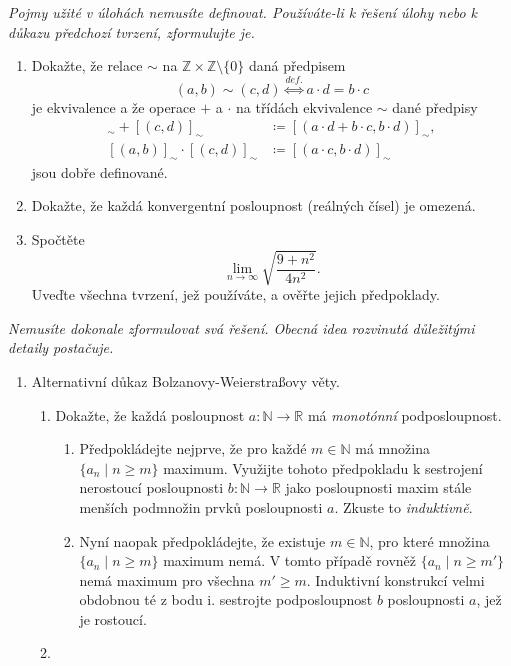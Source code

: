 \documentclass[a4paper,11pt]{article}
\newcommand{\R}{\mathbb{R}}
\newcommand{\N}{\mathbb{N}}
\newcommand{\Z}{\mathbb{Z}}
\begin{document}
 \begin{tcolorbox}[title=\textsf{Lehké úlohy a důkazy (6
  bodů)},arc=0mm,boxsep=3mm,bottomrule=1pt,toprule=3pt,leftrule=-0.1mm,
  rightrule=-0.1mm,colframe=Emerald!80!white,colback=Emerald!5!white]
  \emph{Pojmy užité v úlohách nemusíte definovat. Používáte-li k řešení úlohy
  nebo k důkazu předchozí tvrzení, zformulujte je.}
  \begin{enumerate}
   \item Dokažte, že relace $ \sim $ na $\Z \times \Z \setminus \{0\}$ daná
    předpisem
    \[
     (a,b) \sim (c,d) \overset{def.}{\Longleftrightarrow} a \cdot d = b \cdot c
    \]
    je ekvivalence a že operace $+$ a $ \cdot $ na třídách ekvivalence $ \sim $
    dané předpisy
    \begin{align*}
     [(a,b)]_{ \sim } + [(c,d)]_{ \sim } &\coloneqq [(a \cdot d + b \cdot c, b
     \cdot d)]_{ \sim },\\
     [(a,b)]_{ \sim } \cdot [(c,d)]_{ \sim } & \coloneqq [(a \cdot c,b \cdot
     d)]_{ \sim }
    \end{align*}
    jsou dobře definované.
   \item Dokažte, že každá konvergentní posloupnost (reálných čísel) je
    omezená.
   \item Spočtěte
    \[
     \lim_{n \to \infty} \sqrt{\frac{9 + n^2}{4n^2}}.
    \]
    Uveďte všechna tvrzení, jež používáte, a ověřte jejich předpoklady.
  \end{enumerate}
 \end{tcolorbox}
 \clearpage
 \begin{tcolorbox}[breakable,title=\textsf{Těžké úlohy a důkazy (12
  bodů)},arc=0mm,boxsep=3mm,bottomrule=1pt,toprule=1pt,leftrule=-0.1mm,
  rightrule=-0.1mm,colframe=BrickRed!80!white,colback=BrickRed!5!white]
  \emph{Nemusíte dokonale zformulovat svá řešení. Obecná idea rozvinutá
  důležitými detaily postačuje.}
  \begin{enumerate}
   \item Alternativní důkaz Bolzanovy-Weierstraßovy věty.
   \begin{enumerate}
    \item Dokažte, že každá posloupnost $a:\N \to \R$ má \emph{monotónní}
     podposloupnost.
    \begin{enumerate}
     \item Předpokládejte nejprve, že pro každé $m \in \N$ má množina $\{a_n
      \mid n \geq m\}$ maximum. Využijte tohoto předpokladu k sestrojení
      nerostoucí posloupnosti $b:\N \to \R$ jako posloupnosti maxim stále
      menších podmnožin prvků posloupnosti $a$. Zkuste to \emph{induktivně}.
     \item Nyní naopak předpokládejte, že existuje $m \in \N$, pro které množina
      $\{a_n \mid n \geq m\}$ maximum nemá. V tomto případě rovněž $\{a_n \mid
      n \geq m'\}$ nemá maximum pro všechna $m' \geq m$. Induktivní konstrukcí
      velmi obdobnou té z bodu i. sestrojte podposloupnost $b$ posloupnosti $a$,
      jež je rostoucí.
    \end{enumerate}
   \item 
   \end{enumerate}
  \end{enumerate}
 \end{tcolorbox}
\end{document}
